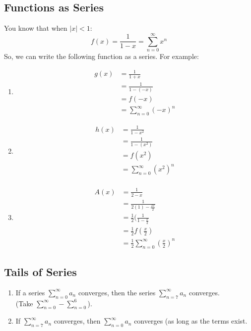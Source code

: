 \documentclass{article}
\begin{document}
\subsection{Functions as Series}
You know that when $|x| < 1$: 
$$f(x) = \frac{1}{1 -x} = \sum_{n=0}^\infty x^n$$
So, we can write the following function as a series. For example:
\begin{enumerate}
    \item \begin{align*}
        g(x) & = \frac{1}{1+x}\\
        & = \frac{1}{1 - (-x)}\\
        & = f(-x)\\
        & = \sum_{n=0}^\infty (-x)^n
    \end{align*}
    
    \item \begin{align*}
        h(x) & = \frac{1}{1-x^2}\\
        & = \frac{1}{1 - (x^2)}\\
        & = f(x^2)\\
        & = \sum_{n=0}^\infty (x^2)^n\\
    \end{align*}
    
    \item \begin{align*}
        A(x) & = \frac{1}{2 - x}\\
        & = \frac{1}{2(1) - \frac{2x}{2}}\\
        & = \frac{1}{2}(\frac{1}{1 - \frac{x}{2}}\\
        & = \frac{1}{2} f(\frac{x}{2})\\
        & = \frac{1}{2}\sum_{n=0}^\infty (\frac{x}{2})^n
    \end{align*}
\end{enumerate}

\subsection{Tails of Series}
\begin{enumerate}
    \item If a series $\sum_{n=0}^\infty a_n$ converges, then the series $\sum_{n=7}^\infty a_n$ converges.\\
    (Take $\sum_{n=0}^\infty - \sum_{n=0}^6$).
    
    \item If $\sum_{n=7}^\infty a_n$ converges, then $\sum_{n=0}^\infty a_n$ converges (as long as the terms exist.
\end{enumerate}
\end{document}
